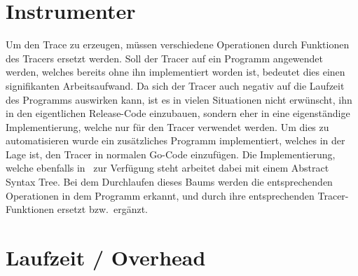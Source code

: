 \section{Instrumenter}
Um den Trace zu erzeugen, müssen verschiedene Operationen durch Funktionen
des Tracers ersetzt werden. Soll der Tracer auf ein Programm angewendet werden, 
welches bereits ohne ihn implementiert worden ist, bedeutet dies einen signifikanten 
Arbeitsaufwand. Da sich der Tracer auch negativ auf die Laufzeit des Programms 
auswirken kann, ist es in vielen Situationen nicht erwünscht, ihn in den 
eigentlichen Release-Code einzubauen, sondern eher in eine eigenständige 
Implementierung, welche nur für den Tracer verwendet werden. Um dies zu
automatisieren wurde ein zusätzliches Programm implementiert, welches in der 
Lage ist, den Tracer in normalen Go-Code einzufügen. Die Implementierung, 
welche ebenfalls in~\cite{GoChan} zur Verfügung steht arbeitet dabei mit einem 
Abstract Syntax Tree. Bei dem Durchlaufen dieses Baums werden die 
entsprechenden Operationen in dem Programm erkannt, und durch ihre entsprechenden 
Tracer-Funktionen ersetzt bzw.\ ergänzt. 


\section{Laufzeit / Overhead}
